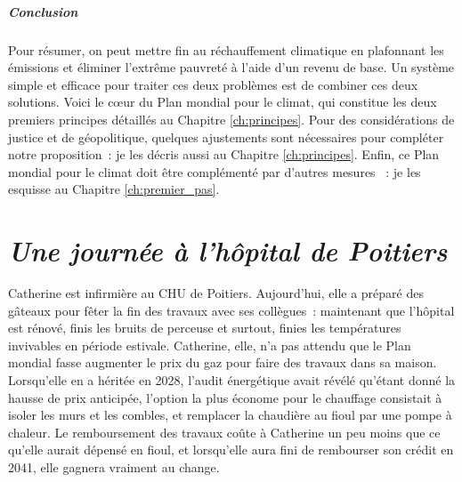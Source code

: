 \documentclass[a5paper,french,openany]{memoir}
\begin{document}

\paragraph{Conclusion}
Pour résumer, on peut mettre fin au réchauffement climatique en plafonnant les émissions et éliminer l'extrême pauvreté à l'aide d'un revenu de base. Un système simple et efficace pour traiter ces deux problèmes est de combiner ces deux solutions. Voici le cœur du Plan mondial pour le climat, %
qui constitue les deux premiers principes détaillés au Chapitre \ref{ch:principes}. Pour des considérations de justice et de géopolitique, quelques ajustements sont nécessaires pour compléter notre proposition~: je les décris aussi au Chapitre \ref{ch:principes}. %
Enfin, ce Plan mondial pour le climat doit être complémenté par d'autres mesures%
~: je les esquisse au Chapitre \ref{ch:premier_pas}.


\chapter*{\textit{Une journée à l'hôpital de Poitiers}}\label{ch:narr_poitiers}

Catherine est infirmière au CHU de Poitiers. Aujourd'hui, elle a préparé des gâteaux pour fêter la fin des travaux avec ses collègues~: maintenant que l'hôpital est rénové, finis les bruits de perceuse et surtout, finies les températures invivables en période estivale. Catherine, elle, n'a pas attendu que le Plan mondial fasse augmenter le prix du gaz %
pour faire des travaux dans sa maison. Lorsqu'elle en a héritée en 2028, l'audit énergétique avait révélé qu'étant donné la hausse de prix anticipée, l'option la plus économe pour le chauffage consistait à isoler les murs et les combles, et remplacer la chaudière au fioul par une pompe à chaleur. Le remboursement des travaux coûte à Catherine un peu moins que ce qu'elle aurait dépensé en fioul, et lorsqu'elle aura fini de rembourser son crédit en 2041, elle gagnera vraiment au change. 
\end{document}
